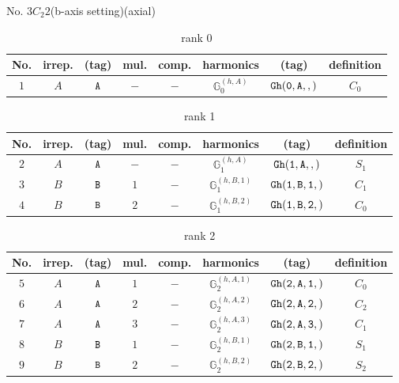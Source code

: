 \documentclass[fleqn,8pt]{jsarticle}
\begin{document}
\setcounter{MaxMatrixCols}{16}

\begin{center}
\LARGE
No. 3\quad$C_{2}$\quad$2$\quad(b-axis setting)\quad[ monoclinic ] (axial)
\end{center}
\begin{table}[ht!]
\begin{center}
\caption{rank 0}
\renewcommand{\arraystretch}{1.3}
\begin{tabular}{cccccccc} \hline \hline
No. & irrep. & (tag) & mul. & comp. & harmonics & (tag) & definition \\ \hline
$ 1 $ & $ A $ & $ {\tt A} $ & $ - $ & $ - $ & $ \mathbb{G}_{0}^{(h,A)} $ & $ {\tt Gh(0,A,,)} $ & $ C_{0} $ \\
 \hline \hline
\end{tabular}
\end{center}
\end{table}
\begin{table}[ht!]
\begin{center}
\caption{rank 1}
\renewcommand{\arraystretch}{1.3}
\begin{tabular}{cccccccc} \hline \hline
No. & irrep. & (tag) & mul. & comp. & harmonics & (tag) & definition \\ \hline
$ 2 $ & $ A $ & $ {\tt A} $ & $ - $ & $ - $ & $ \mathbb{G}_{1}^{(h,A)} $ & $ {\tt Gh(1,A,,)} $ & $ S_{1} $ \\
$ 3 $ & $ B $ & $ {\tt B} $ & $ 1 $ & $ - $ & $ \mathbb{G}_{1}^{(h,B,1)} $ & $ {\tt Gh(1,B,1,)} $ & $ C_{1} $ \\
$ 4 $ & $ B $ & $ {\tt B} $ & $ 2 $ & $ - $ & $ \mathbb{G}_{1}^{(h,B,2)} $ & $ {\tt Gh(1,B,2,)} $ & $ C_{0} $ \\
 \hline \hline
\end{tabular}
\end{center}
\end{table}
\begin{table}[ht!]
\begin{center}
\caption{rank 2}
\renewcommand{\arraystretch}{1.3}
\begin{tabular}{cccccccc} \hline \hline
No. & irrep. & (tag) & mul. & comp. & harmonics & (tag) & definition \\ \hline
$ 5 $ & $ A $ & $ {\tt A} $ & $ 1 $ & $ - $ & $ \mathbb{G}_{2}^{(h,A,1)} $ & $ {\tt Gh(2,A,1,)} $ & $ C_{0} $ \\
$ 6 $ & $ A $ & $ {\tt A} $ & $ 2 $ & $ - $ & $ \mathbb{G}_{2}^{(h,A,2)} $ & $ {\tt Gh(2,A,2,)} $ & $ C_{2} $ \\
$ 7 $ & $ A $ & $ {\tt A} $ & $ 3 $ & $ - $ & $ \mathbb{G}_{2}^{(h,A,3)} $ & $ {\tt Gh(2,A,3,)} $ & $ C_{1} $ \\
$ 8 $ & $ B $ & $ {\tt B} $ & $ 1 $ & $ - $ & $ \mathbb{G}_{2}^{(h,B,1)} $ & $ {\tt Gh(2,B,1,)} $ & $ S_{1} $ \\
$ 9 $ & $ B $ & $ {\tt B} $ & $ 2 $ & $ - $ & $ \mathbb{G}_{2}^{(h,B,2)} $ & $ {\tt Gh(2,B,2,)} $ & $ S_{2} $ \\
 \hline \hline
\end{tabular}
\end{center}
\end{table}
\end{document}

